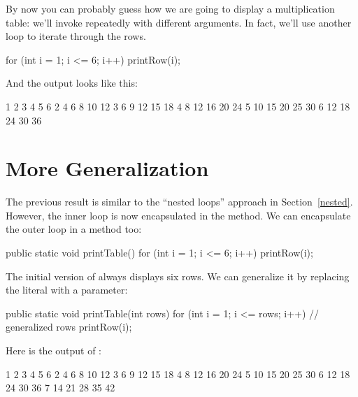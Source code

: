 By now you can probably guess how we are going to display a multiplication table: we'll invoke  repeatedly with different arguments.
In fact, we'll use another loop to iterate through the rows.

\begin{code}
for (int i = 1; i <= 6; i++) {
    printRow(i);
}
\end{code}

And the output looks like this:

\begin{stdout}
   1   2   3   4   5   6
   2   4   6   8  10  12
   3   6   9  12  15  18
   4   8  12  16  20  24
   5  10  15  20  25  30
   6  12  18  24  30  36
\end{stdout}



\section{More Generalization}

The previous result is similar to the ``nested loops'' approach in Section~\ref{nested}.
However, the inner loop is now encapsulated in the  method.
We can encapsulate the outer loop in a method too:

\begin{code}
public static void printTable() {
    for (int i = 1; i <= 6; i++) {
        printRow(i);
    }
}
\end{code}

The initial version of  always displays six rows.
We can generalize it by replacing the literal  with a parameter:

\begin{code}
public static void printTable(int rows) {
    for (int i = 1; i <= rows; i++) {     // generalized rows
        printRow(i);
    }
}
\end{code}

Here is the output of :

\begin{stdout}
   1   2   3   4   5   6
   2   4   6   8  10  12
   3   6   9  12  15  18
   4   8  12  16  20  24
   5  10  15  20  25  30
   6  12  18  24  30  36
   7  14  21  28  35  42
\end{stdout}

